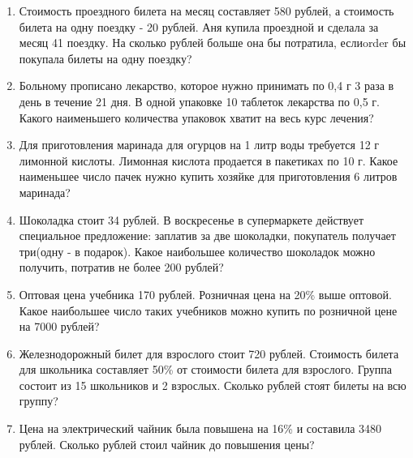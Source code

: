 \begin{enumerate}
	\item Стоимость проездного билета на месяц составляет 580 рублей, а стоимость билета на одну поездку - 20 рублей. Аня купила проездной и сделала за месяц 41 поездку. На сколько рублей больше она бы потратила, еслиorder бы покупала билеты на одну поездку?
	
	\item Больному прописано лекарство, которое нужно принимать по 0,4 г 3 раза в день в течение 21 дня. В одной упаковке 10 таблеток лекарства по 0,5 г. Какого наименьшего количества упаковок хватит на весь курс лечения?
	
	\item Для приготовления маринада для огурцов на 1 литр воды требуется 12 г лимонной кислоты. Лимонная кислота продается в пакетиках по 10 г. Какое наименьшее число пачек нужно купить хозяйке для приготовления 6 литров маринада?
	
	\item Шоколадка стоит 34 рублей. В воскресенье в супермаркете действует специальное предложение: заплатив за две шоколадки, покупатель получает три(одну - в подарок). Какое наибольшее количество шоколадок можно получить, потратив не более 200 рублей?
	
	\item Оптовая цена учебника 170 рублей. Розничная цена на 20\% выше оптовой. Какое наибольшее число таких учебников можно купить по розничной цене на 7000 рублей?
	
	\item Железнодорожный билет для взрослого стоит 720 рублей. Стоимость билета для школьника составляет 50\% от стоимости билета для взрослого. Группа состоит из 15 школьников и 2 взрослых. Сколько рублей стоят билеты на всю группу?
	
	\item Цена на электрический чайник была повышена на 16\% и составила 3480 рублей. Сколько рублей стоил чайник до повышения цены?

	
	
\end{enumerate}
